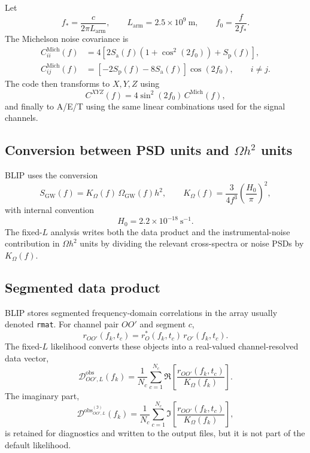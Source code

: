 \documentclass[11pt]{article}
\newcommand{\Om}{\Omega_{\mathrm{GW}}}
\newcommand{\fstar}{f_{\ast}}
\newcommand{\Larm}{L_{\mathrm{arm}}}
\newcommand{\Dobs}{\mathcal{D}^{\mathrm{obs}}}
\begin{document}
Let
\begin{equation}
  \fstar = \frac{c}{2\pi \Larm},
  \qquad
  \Larm = 2.5 \times 10^9~\mathrm{m},
  \qquad
  f_0 = \frac{f}{2\fstar}.
\end{equation}
The Michelson noise covariance is
\begin{align}
  C_{ii}^{\mathrm{Mich}}(f)
  &=
  4\left[
    2S_{\mathrm{a}}(f)\left(1+\cos^2(2f_0)\right) + S_{\mathrm{p}}(f)
  \right], \\
  C_{ij}^{\mathrm{Mich}}(f)
  &=
  \left[-2S_{\mathrm{p}}(f)-8S_{\mathrm{a}}(f)\right]\cos(2f_0),
  \qquad i\neq j.
\end{align}
The code then transforms to $X,Y,Z$ using
\begin{equation}
  C^{XYZ}(f) = 4\sin^2(2f_0)\,C^{\mathrm{Mich}}(f),
\end{equation}
and finally to A/E/T using the same linear combinations used for the signal channels.

\subsection{Conversion between PSD units and $\Omega h^2$ units}

BLIP uses the conversion
\begin{equation}
  S_{\mathrm{GW}}(f)
  =
  K_{\Omega}(f)\,\Om(f) h^2,
  \qquad
  K_{\Omega}(f)
  =
  \frac{3}{4f^3}\left(\frac{H_0}{\pi}\right)^2,
\end{equation}
with internal convention
\begin{equation}
  H_0 = 2.2 \times 10^{-18}~\mathrm{s}^{-1}.
\end{equation}
The fixed-$L$ analysis writes both the data product and the instrumental-noise contribution in $\Omega h^2$ units by dividing the relevant cross-spectra or noise PSDs by $K_{\Omega}(f)$.

\subsection{Segmented data product}

BLIP stores segmented frequency-domain correlations in the array usually denoted \texttt{rmat}. For channel pair $OO'$ and segment $c$,
\begin{equation}
  r_{OO'}(f_k,t_c)
  =
  r_O^{\ast}(f_k,t_c)\,r_{O'}(f_k,t_c).
\end{equation}
The fixed-$L$ likelihood converts these objects into a real-valued channel-resolved data vector,
\begin{equation}
  \Dobs_{OO',L}(f_k)
  =
  \frac{1}{N_c}
  \sum_{c=1}^{N_c}
  \Re\!\left[
    \frac{r_{OO'}(f_k,t_c)}{K_{\Omega}(f_k)}
  \right].
  \label{eq:data-product}
\end{equation}
The imaginary part,
\begin{equation}
  \Dobs^{(\Im)}_{OO',L}(f_k)
  =
  \frac{1}{N_c}
  \sum_{c=1}^{N_c}
  \Im\!\left[
    \frac{r_{OO'}(f_k,t_c)}{K_{\Omega}(f_k)}
  \right],
\end{equation}
is retained for diagnostics and written to the output files, but it is not part of the default likelihood.
\end{document}
